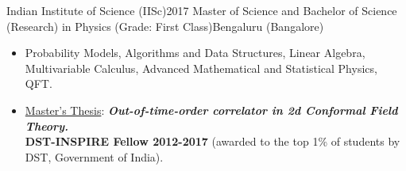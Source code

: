 \resumeSubheading
  {Indian Institute of Science (IISc)}{2017}
  {Master of Science and Bachelor of Science (Research) in Physics  (Grade: First Class)}{Bengaluru (Bangalore)}
\begin{itemize}[leftmargin=*, noitemsep=2, partopsep=0pt]
\vspace{3pt}
\item Probability Models, Algorithms and Data Structures, Linear Algebra, Multivariable Calculus, Advanced Mathematical and Statistical Physics, QFT.
\vspace{1pt}
\item \underline{Master's Thesis}: \textit{\textbf{Out-of-time-order correlator in 2d Conformal Field Theory.}}\\
\textbf{DST-INSPIRE Fellow 2012-2017} (awarded to the top 1\% of students by DST, Government of India).
\end{itemize}

\resumeSubHeadingListEnd

\vspace{-4pt}
